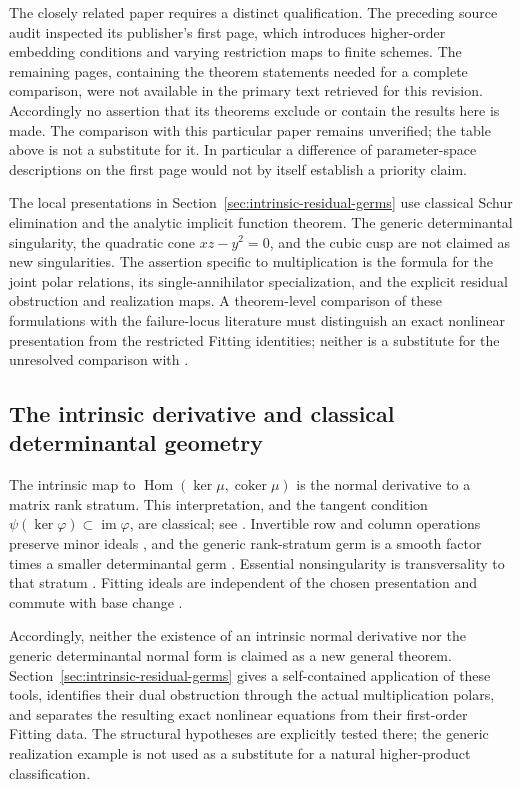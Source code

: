 The closely related paper \cite{Ballico93} requires a distinct
qualification. The preceding source audit inspected its publisher's first page, which
introduces higher-order embedding conditions and varying restriction
maps to finite schemes. The remaining pages, containing the theorem
statements needed for a complete comparison, were not available in
the primary text retrieved for this revision. Accordingly no assertion
that its theorems exclude or contain the results here is made. The
comparison with this particular paper remains unverified; the table
above is not a substitute for it. In particular a difference of
parameter-space descriptions on the first page would not by itself
establish a priority claim.

The local presentations in Section~\ref{sec:intrinsic-residual-germs}
use classical Schur elimination and the analytic implicit function
theorem. The generic determinantal singularity, the quadratic cone
$xz-y^2=0$, and the cubic cusp are not claimed as new singularities.
The assertion specific to multiplication is the formula for the joint
polar relations, its single-annihilator specialization, and the
explicit residual obstruction and realization maps. A theorem-level
comparison of these formulations with the failure-locus literature
must distinguish an exact nonlinear presentation from the restricted
Fitting identities; neither is a substitute for the unresolved
comparison with \cite{Ballico93}.

\subsection{The intrinsic derivative and classical determinantal geometry}
The intrinsic map to $\operatorname{Hom}(\ker\mu,\operatorname{coker}\mu)$
is the normal derivative to a matrix rank stratum. This interpretation,
and the tangent condition $\psi(\ker\varphi)\subset\operatorname{im}\varphi$,
are classical; see \cite[Remark 1.18]{FKZ21}. Invertible row and column
operations preserve minor ideals \cite[Lemma 1.3]{FKZ21}, and the generic
rank-stratum germ is a smooth factor times a smaller determinantal germ
\cite[Section 1.3.2, equation (13)]{FKZ21}. Essential nonsingularity is
transversality to that stratum \cite[Definition 2.11 and Proposition 2.12]{FKZ21}.
Fitting ideals are independent of the chosen presentation and commute
with base change \cite[Tags 07Z8 and 07ZA]{StacksFitting}.

Accordingly, neither the existence of an intrinsic normal derivative
nor the generic determinantal normal form is claimed as a new general
theorem. Section~\ref{sec:intrinsic-residual-germs} gives a
self-contained application of these tools, identifies their dual
obstruction through the actual multiplication polars, and separates
the resulting exact nonlinear equations from their first-order
Fitting data. The structural hypotheses are explicitly tested there;
the generic realization example is not used as a substitute for a
natural higher-product classification.

